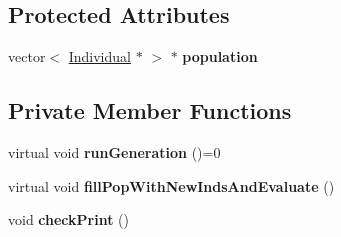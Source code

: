 \subsection*{Protected Attributes}
\begin{DoxyCompactItemize}
\item 
\mbox{\label{classEA_abb8743d21c3db992b53356e1d8fe2646}} 
vector$<$ \mbox{\hyperlink{classIndividual}{Individual}} $\ast$ $>$ $\ast$ {\bfseries population}
\end{DoxyCompactItemize}
\subsection*{Private Member Functions}
\begin{DoxyCompactItemize}
\item 
\mbox{\label{classEA_ab5586c481933e063694c45d487757c82}} 
virtual void {\bfseries run\+Generation} ()=0
\item 
\mbox{\label{classEA_ae99a3c887d3014a59bce9501add80308}} 
virtual void {\bfseries fill\+Pop\+With\+New\+Inds\+And\+Evaluate} ()
\item 
\mbox{\label{classEA_a1375cfc8e01a4e7520633051e4193e7a}} 
void {\bfseries check\+Print} ()
\end{DoxyCompactItemize}
